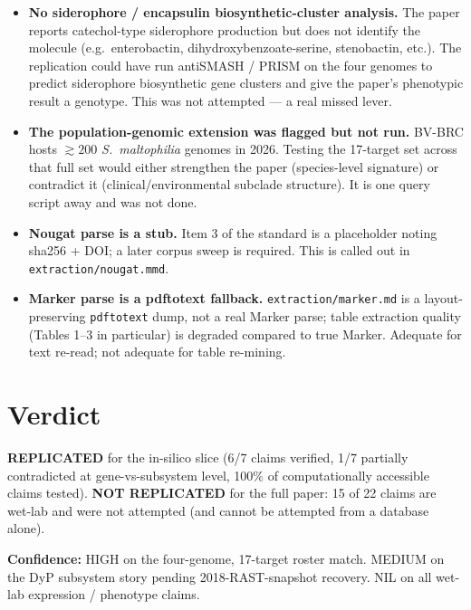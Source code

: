 \documentclass[10pt,a4paper]{article}
\begin{document}
\begin{itemize}[leftmargin=1.4em,itemsep=3pt]
\item \textbf{No siderophore / encapsulin biosynthetic-cluster analysis.} The
paper reports catechol-type siderophore production but does not identify the
molecule (e.g.\ enterobactin, dihydroxybenzoate-serine, stenobactin, etc.).
The replication could have run antiSMASH / PRISM on the four genomes to
predict siderophore biosynthetic gene clusters and give the paper's phenotypic
result a genotype. This was not attempted --- a real missed lever.

\item \textbf{The population-genomic extension was flagged but not run.}
BV-BRC hosts $\gtrsim 200$ \textit{S.\ maltophilia} genomes in 2026. Testing
the 17-target set across that full set would either strengthen the paper
(species-level signature) or contradict it (clinical/environmental subclade
structure). It is one query script away and was not done.

\item \textbf{Nougat parse is a stub.} Item 3 of the standard is a placeholder
noting sha256 + DOI; a later corpus sweep is required. This is called out in
\texttt{extraction/nougat.mmd}.

\item \textbf{Marker parse is a pdftotext fallback.} \texttt{extraction/marker.md}
is a layout-preserving \texttt{pdftotext} dump, not a real Marker parse; table
extraction quality (Tables 1--3 in particular) is degraded compared to true
Marker. Adequate for text re-read; not adequate for table re-mining.
\end{itemize}

\section{Verdict}
\textbf{REPLICATED} for the in-silico slice (6/7 claims verified, 1/7 partially
contradicted at gene-vs-subsystem level, 100\% of computationally accessible
claims tested). \textbf{NOT REPLICATED} for the full paper: 15 of 22 claims are
wet-lab and were not attempted (and cannot be attempted from a database alone).

\textbf{Confidence:} HIGH on the four-genome, 17-target roster match.
MEDIUM on the DyP subsystem story pending 2018-RAST-snapshot recovery.
NIL on all wet-lab expression / phenotype claims.


\end{document}
